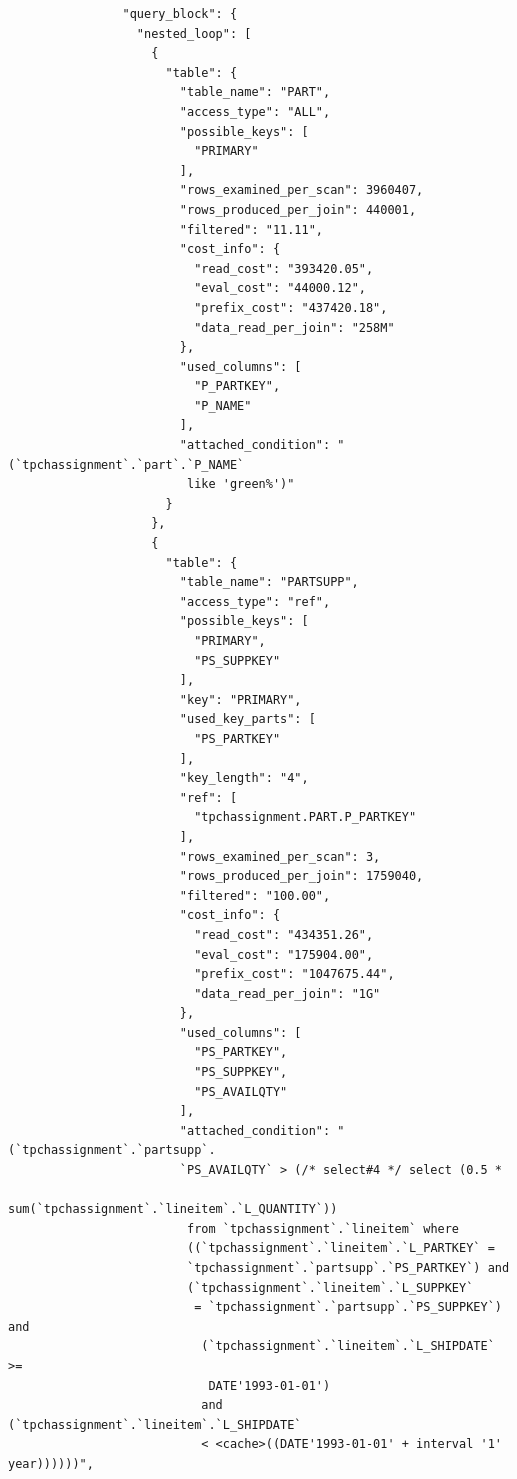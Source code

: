 \documentclass{article}
\begin{document}
\begin{lstlisting}
                "query_block": {
                  "nested_loop": [
                    {
                      "table": {
                        "table_name": "PART",
                        "access_type": "ALL",
                        "possible_keys": [
                          "PRIMARY"
                        ],
                        "rows_examined_per_scan": 3960407,
                        "rows_produced_per_join": 440001,
                        "filtered": "11.11",
                        "cost_info": {
                          "read_cost": "393420.05",
                          "eval_cost": "44000.12",
                          "prefix_cost": "437420.18",
                          "data_read_per_join": "258M"
                        },
                        "used_columns": [
                          "P_PARTKEY",
                          "P_NAME"
                        ],
                        "attached_condition": "(`tpchassignment`.`part`.`P_NAME`
                         like 'green%')"
                      }
                    },
                    {
                      "table": {
                        "table_name": "PARTSUPP",
                        "access_type": "ref",
                        "possible_keys": [
                          "PRIMARY",
                          "PS_SUPPKEY"
                        ],
                        "key": "PRIMARY",
                        "used_key_parts": [
                          "PS_PARTKEY"
                        ],
                        "key_length": "4",
                        "ref": [
                          "tpchassignment.PART.P_PARTKEY"
                        ],
                        "rows_examined_per_scan": 3,
                        "rows_produced_per_join": 1759040,
                        "filtered": "100.00",
                        "cost_info": {
                          "read_cost": "434351.26",
                          "eval_cost": "175904.00",
                          "prefix_cost": "1047675.44",
                          "data_read_per_join": "1G"
                        },
                        "used_columns": [
                          "PS_PARTKEY",
                          "PS_SUPPKEY",
                          "PS_AVAILQTY"
                        ],
                        "attached_condition": "(`tpchassignment`.`partsupp`.
                        `PS_AVAILQTY` > (/* select#4 */ select (0.5 *
                         sum(`tpchassignment`.`lineitem`.`L_QUANTITY`)) 
                         from `tpchassignment`.`lineitem` where 
                         ((`tpchassignment`.`lineitem`.`L_PARTKEY` = 
                         `tpchassignment`.`partsupp`.`PS_PARTKEY`) and 
                         (`tpchassignment`.`lineitem`.`L_SUPPKEY`
                          = `tpchassignment`.`partsupp`.`PS_SUPPKEY`) and
                           (`tpchassignment`.`lineitem`.`L_SHIPDATE` >=
                            DATE'1993-01-01') 
                           and (`tpchassignment`.`lineitem`.`L_SHIPDATE` 
                           < <cache>((DATE'1993-01-01' + interval '1' year))))))",


\end{lstlisting}
\end{document}
